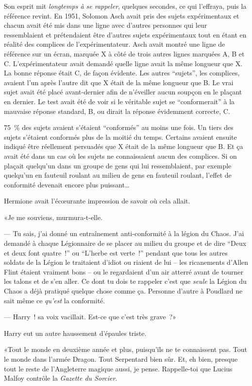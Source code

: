Son esprit mit \emph{longtemps à se rappeler}, quelques secondes, ce qui l'effraya, puis la référence revint. En 1951, Solomon Asch avait pris des sujets expérimentaux et chacun avait été mis dans une ligne avec d'autres personnes qui leur ressemblaient et prétendaient être d'autres sujets expérimentaux tout en étant en réalité des complices de l'expérimentateur. Asch avait montré une ligne de référence sur un écran, marquée X à côté de trois autres lignes marquées A, B et C. L'expérimentateur avait demandé quelle ligne avait la même longueur que X. La bonne réponse était C, de façon évidente. Les autres “sujets”, les complices, avaient l'un après l'autre dit que X était de la même longueur que B. Le vrai sujet avait été placé avant-dernier afin de n'éveiller aucun soupçon en le plaçant en dernier. Le test avait été de voir si le véritable sujet se “conformerait” à la mauvaise réponse standard, B, ou dirait la réponse évidemment correcte, C.

75~\% des sujets avaient s'étaient “conformés” au moins une fois. Un tiers des sujets s'étaient conformés plus de la moitié du temps. Certains avaient ensuite indiqué être réellement persuadés que X était de la même longueur que B. Et ça avait été dans un cas où les sujets ne connaissaient aucun des complices. Si on plaçait quelqu'un dans un groupe de gens qui lui ressemblaient, par exemple quelqu'un en fauteuil roulant au milieu de gens en fauteuil roulant, l'effet de conformité devenait encore plus puissant…

Hermione avait l'écœurante impression de savoir où cela allait.

«Je me souviens, murmura-t-elle.

--- Tu sais, j'ai donné un entraînement anti-conformité à la légion du Chaos. J'ai demandé à chaque Légionnaire de se placer au milieu du groupe et de dire “Deux et deux font quatre~!” ou “L'herbe est verte~!” pendant que tous les autres soldats de la Légion le traitaient d'idiot ou riaient de lui -- les ricanements d'Allen Flint étaient vraiment bons -- ou le regardaient d'un air atterré avant de tourner les talons et de s'en aller. Ce dont tu dois te rappeler c'est que \emph{seule} la Légion du Chaos a déjà pratiqué quelque chose comme ça. Personne d'autre à Poudlard ne sait même ce \emph{qu'est} la conformité.

--- Harry~! sa voix vacillait. Est-ce que c'est très grave~?»

Harry eut un autre haussement d'épaules triste.

«Tout le monde en deuxième année et plus, puisqu'ils ne te connaissent pas. Tout le monde dans l'armée Dragon. Tout Serpentard bien sûr. Et, eh bien, presque tout le reste de l'Angleterre magique aussi, je pense. Rappelle-toi que Lucius Malfoy contrôle la \emph{Gazette du Sorcier}.

